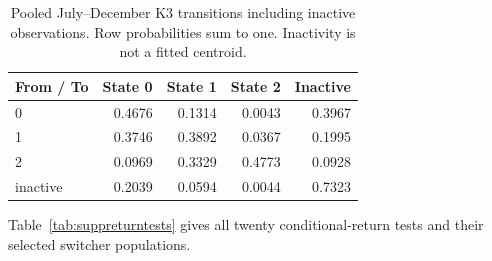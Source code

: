 \documentclass[journal,letterpaper]{IEEEtran}
\begin{document}
\begin{table}[t]
\centering\footnotesize
\caption{Pooled July--December K3 transitions including inactive observations. Row probabilities sum to one. Inactivity is not a fitted centroid.}
\label{tab:suppinactivematrix}
\begin{tabular}{lrrrr}
\toprule
From / To & State 0 & State 1 & State 2 & Inactive \\
\midrule
0 & 0.4676 & 0.1314 & 0.0043 & 0.3967 \\
1 & 0.3746 & 0.3892 & 0.0367 & 0.1995 \\
2 & 0.0969 & 0.3329 & 0.4773 & 0.0928 \\
inactive & 0.2039 & 0.0594 & 0.0044 & 0.7323 \\
\bottomrule
\end{tabular}
\end{table}
Table~\ref{tab:suppreturntests} gives all twenty conditional-return tests and their selected switcher populations.
\end{document}
